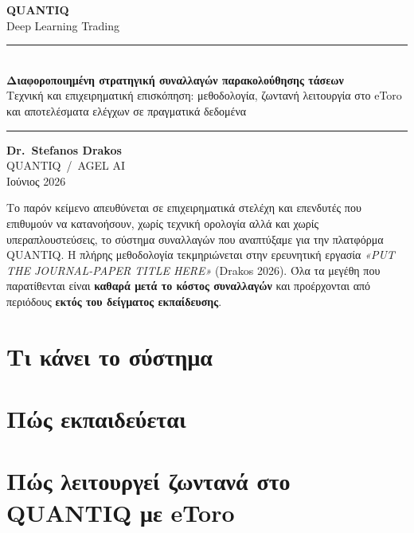 \documentclass[11pt]{article}
\newcommand{\modeltitle}{Διαφοροποιημένη στρατηγική συναλλαγών παρακολούθησης τάσεων}
\newcommand{\modelsubtitle}{Τεχνική και επιχειρηματική επισκόπηση: μεθοδολογία, ζωντανή λειτουργία στο eToro και αποτελέσματα ελέγχων σε πραγματικά δεδομένα}
\newcommand{\papertitle}{\emph{«PUT THE JOURNAL-PAPER TITLE HERE»} (Drakos 2026)}
\newcommand{\reportdate}{Ιούνιος 2026}
\begin{document}
\begin{titlepage}\centering\thispagestyle{empty}
\vspace*{3.2cm}
{\sffamily\bfseries\fontsize{52}{56}\selectfont QUANTIQ}\\[14pt]
{\sffamily\fontsize{22}{26}\selectfont\color{accent} Deep Learning Trading}\\[3.4cm]
\rule{0.66\linewidth}{0.4pt}\\[18pt]
{\large\bfseries \modeltitle}\\[8pt]
{\normalsize \modelsubtitle}\\[14pt]
\rule{0.66\linewidth}{0.4pt}
\vfill
{\large\bfseries Dr.\ Stefanos Drakos}\\[5pt]
{\normalsize QUANTIQ \,/\, AGEL AI}\\[3pt]
{\small \reportdate}
\end{titlepage}

\noindent
Το παρόν κείμενο απευθύνεται σε επιχειρηματικά στελέχη και επενδυτές που επιθυμούν να κατανοήσουν,
χωρίς τεχνική ορολογία αλλά και χωρίς υπεραπλουστεύσεις, το σύστημα συναλλαγών που αναπτύξαμε για την
πλατφόρμα QUANTIQ. %
Η πλήρης μεθοδολογία τεκμηριώνεται στην ερευνητική εργασία \papertitle. Όλα τα μεγέθη που
παρατίθενται είναι \textbf{καθαρά μετά το κόστος συναλλαγών} και προέρχονται από περιόδους
\textbf{εκτός του δείγματος εκπαίδευσης}.

\section{Τι κάνει το σύστημα}

\section{Πώς εκπαιδεύεται}

\section{Πώς λειτουργεί ζωντανά στο QUANTIQ με eToro}
\end{document}
